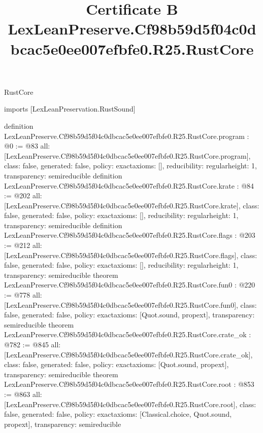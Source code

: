 \begin{lexlean}{RustCore}
\title{Certificate B LexLeanPreserve.Cf98b59d5f04c0dbcac5e0ee007efbfe0.R25.RustCore}
\begin{coremodule}
imports [LexLeanPreservation.RustSound]

definition LexLeanPreserve.Cf98b59d5f04c0dbcac5e0ee007efbfe0.R25.RustCore.program : @0 := @83 {
  all: [LexLeanPreserve.Cf98b59d5f04c0dbcac5e0ee007efbfe0.R25.RustCore.program],
  class: false,
  generated: false,
  policy: exact{axioms: []},
  reducibility: regular{height: 1},
  transparency: semireducible
}
definition LexLeanPreserve.Cf98b59d5f04c0dbcac5e0ee007efbfe0.R25.RustCore.krate : @84 := @202 {
  all: [LexLeanPreserve.Cf98b59d5f04c0dbcac5e0ee007efbfe0.R25.RustCore.krate],
  class: false,
  generated: false,
  policy: exact{axioms: []},
  reducibility: regular{height: 1},
  transparency: semireducible
}
definition LexLeanPreserve.Cf98b59d5f04c0dbcac5e0ee007efbfe0.R25.RustCore.flags : @203 := @212 {
  all: [LexLeanPreserve.Cf98b59d5f04c0dbcac5e0ee007efbfe0.R25.RustCore.flags],
  class: false,
  generated: false,
  policy: exact{axioms: []},
  reducibility: regular{height: 1},
  transparency: semireducible
}
theorem LexLeanPreserve.Cf98b59d5f04c0dbcac5e0ee007efbfe0.R25.RustCore.fun0 : @220 := @778 {
  all: [LexLeanPreserve.Cf98b59d5f04c0dbcac5e0ee007efbfe0.R25.RustCore.fun0],
  class: false,
  generated: false,
  policy: exact{axioms: [Quot.sound, propext]},
  transparency: semireducible
}
theorem LexLeanPreserve.Cf98b59d5f04c0dbcac5e0ee007efbfe0.R25.RustCore.crate_ok : @782 := @845 {
  all: [LexLeanPreserve.Cf98b59d5f04c0dbcac5e0ee007efbfe0.R25.RustCore.crate_ok],
  class: false,
  generated: false,
  policy: exact{axioms: [Quot.sound, propext]},
  transparency: semireducible
}
theorem LexLeanPreserve.Cf98b59d5f04c0dbcac5e0ee007efbfe0.R25.RustCore.root : @853 := @863 {
  all: [LexLeanPreserve.Cf98b59d5f04c0dbcac5e0ee007efbfe0.R25.RustCore.root],
  class: false,
  generated: false,
  policy: exact{axioms: [Classical.choice, Quot.sound, propext]},
  transparency: semireducible
}


\end{coremodule}
\end{lexlean}
